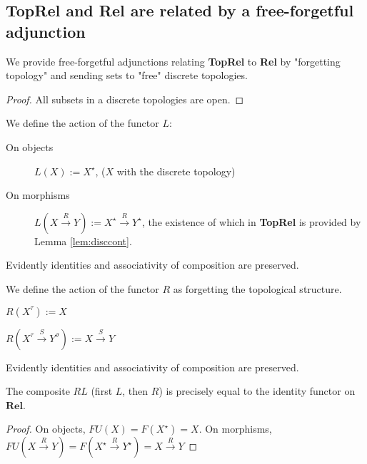 \begin{fullwidth}
\subsection{\textbf{TopRel} and \textbf{Rel} are related by a free-forgetful adjunction}

We provide free-forgetful adjunctions relating \textbf{TopRel} to \textbf{Rel} by "forgetting topology" and sending sets to "free" discrete topologies.


\begin{lemma}\label{lem:disccont}
\begin{proof}
All subsets in a discrete topologies are open.
\end{proof}
\end{lemma}

\begin{defn} We define the action of the functor $L$:
\begin{description}
\item[On objects] $L(X) := X^\star$, ($X$ with the discrete topology)
\item[On morphisms] $L(X \overset{R}{\rightarrow} Y) := X^\star \overset{R}{\rightarrow} Y^\star$, the existence of which in \textbf{TopRel} is provided by Lemma \ref{lem:disccont}.
\end{description}
Evidently identities and associativity of composition are preserved.
\end{defn}

\begin{defn}
\begin{description} We define the action of the functor $R$ as forgetting the topological structure.
\item[On objects] $R(X^\tau) := X$
\item[On morphisms] $R(X^\tau \overset{S}{\rightarrow} Y^\sigma) := X \overset{S}{\rightarrow} Y$
\end{description}
Evidently identities and associativity of composition are preserved.
\end{defn}


\begin{lemma}[$RL = 1_{\textbf{Rel}}$]\label{lem:idadj}
The composite $RL$ (first $L$, then $R$) is precisely equal to the identity functor on $\mathbf{Rel}$.
\begin{proof}
On objects, $FU(X) = F(X^\star) = X$. On morphisms, $FU(X \overset{R}{\rightarrow} Y) = F(X^\star \overset{R}{\rightarrow} Y^\star) = X \overset{R}{\rightarrow} Y$
\end{proof}
\end{lemma}


\end{fullwidth}
